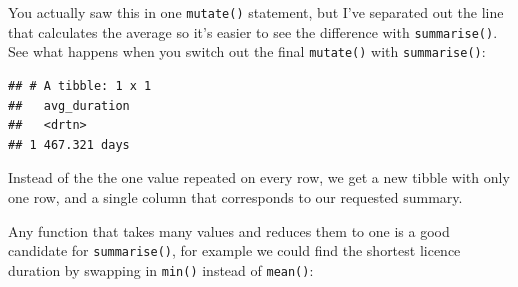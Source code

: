 \documentclass[]{Nemilov}
\newenvironment{Shaded}{\begin{snugshade}}{\end{snugshade}}
\newcommand{\DataTypeTok}[1]{\textcolor[rgb]{0.13,0.29,0.53}{#1}}
\newcommand{\KeywordTok}[1]{\textcolor[rgb]{0.13,0.29,0.53}{\textbf{#1}}}
\newcommand{\NormalTok}[1]{#1}
\newcommand{\OperatorTok}[1]{\textcolor[rgb]{0.81,0.36,0.00}{\textbf{#1}}}
\newcommand{\StringTok}[1]{\textcolor[rgb]{0.31,0.60,0.02}{#1}}
\begin{document}
\begin{Shaded}
\end{Shaded}

You actually saw this in one \texttt{mutate()} statement, but I've separated out the line that calculates the average so it's easier to see the difference with \texttt{summarise()}. See what happens when you switch out the final \texttt{mutate()} with \texttt{summarise()}:

\begin{Shaded}
\end{Shaded}

\begin{verbatim}
## # A tibble: 1 x 1
##   avg_duration
##   <drtn>      
## 1 467.321 days
\end{verbatim}

Instead of the the one value repeated on every row, we get a new tibble with only one row, and a single column that corresponds to our requested summary.

Any function that takes many values and reduces them to one is a good candidate for \texttt{summarise()}, for example we could find the shortest licence duration by swapping in \texttt{min()} instead of \texttt{mean()}:

\begin{Shaded}
\end{Shaded}
\end{document}

